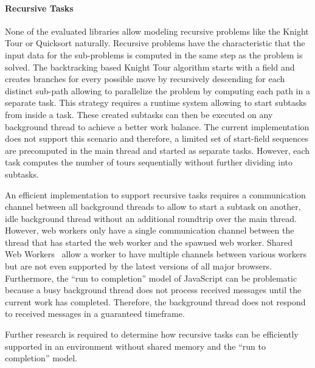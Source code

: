 \paragraph{Recursive Tasks} 
None of the evaluated libraries allow modeling recursive problems like the Knight Tour or Quicksort naturally. Recursive problems have the characteristic that the input data for the sub-problems is computed in the same step as the problem is solved. The backtracking based Knight Tour algorithm starts with a field and creates branches for every possible move by recursively descending for each distinct sub-path allowing to parallelize the problem by computing each path in a separate task. This strategy requires a runtime system allowing to start subtasks from inside a task. These created subtasks can then be executed on any background thread to achieve a better work balance. The current implementation does not support this scenario and therefore, a limited set of start-field sequences are precomputed in the main thread and started as separate tasks. However, each task computes the number of tours sequentially without further dividing into subtasks.


An efficient implementation to support recursive tasks requires a communication channel between all background threads to allow to start a subtask on another, idle background thread without an additional roundtrip over the main thread. However, web workers only have a single communication channel between the thread that has started the web worker and the spawned web worker. Shared Web Workers~\cite[section 4.6.4]{w3cWebWorker} allow a worker to have multiple channels between various workers but are not even supported by the latest versions of all major browsers. Furthermore, the \enquote{run to completion} model of JavaScript can be problematic because a busy background thread does not process received messages until the current work has completed. Therefore, the background thread does not respond to received messages in a guaranteed timeframe.

Further research is required to determine how recursive tasks can be efficiently supported in an environment without shared memory and the \enquote{run to completion} model.

